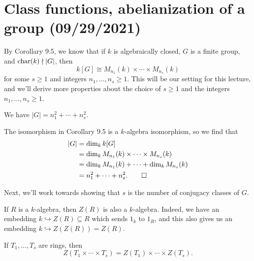 \section{Class functions, abelianization of a group (09/29/2021)}
By Corollary 9.5, we know that if $k$ is algebraically closed, $G$ 
is a finite group, and $\operatorname{char}(k) \nmid |G|$, then 
\[ k[G] \cong M_{n_1}(k) \times \cdots \times M_{n_s}(k) \] 
for some $s \geq 1$ and integers $n_1, \dots, n_s \geq 1$. 
This will be our setting for this lecture, and
we'll derive more properties about the choice of $s \geq 1$ and the integers 
$n_1, \dots, n_s \geq 1$. 

\begin{theo}{}
    We have $|G| = n_1^2 + \cdots + n_s^2$. 
\end{theo}
\begin{pf}
    The isomorphism in Corollary 9.5 is a $k$-algebra isomorphism, so we 
    find that 
    \begin{align*}
        |G| &= \dim_k k[G] \\
        &= \dim_k M_{n_1}(k) \times \cdots \times M_{n_s}(k) \\
        &= \dim_k M_{n_1}(k) + \cdots + \dim_k M_{n_s}(k) \\
        &= n_1^2 + \cdots + n_s^2. \qedhere 
    \end{align*}
\end{pf}

Next, we'll work towards showing that $s$ is the number of conjugacy classes of $G$.

\begin{remark}{}
    If $R$ is a $k$-algebra, then $Z(R)$ is also a $k$-algebra. Indeed, we have
    an embedding $k \hookrightarrow Z(R) \subseteq R$ which sends $1_k$ 
    to $1_R$, and this also gives us an embedding $k \hookrightarrow 
    Z(Z(R)) = Z(R)$. 
\end{remark}

\begin{remark}{}
    If $T_1, \dots, T_s$ are rings, then 
    \[ Z(T_1 \times \cdots \times T_s) = Z(T_1) \times \cdots \times Z(T_s). \]
\end{remark}


